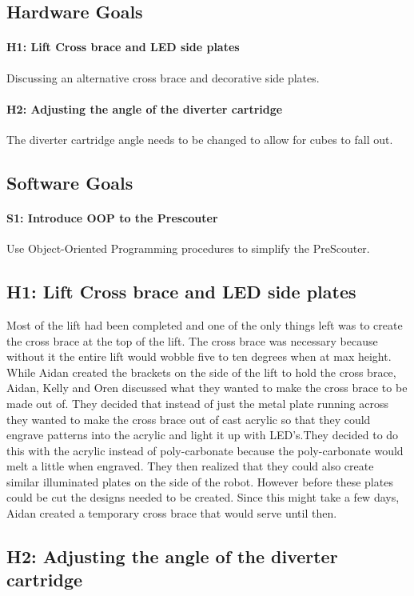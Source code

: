 \documentclass{article}
\begin{document}
\subsection{Hardware Goals}
\paragraph{H1: Lift Cross brace and LED side plates}
 Discussing an alternative cross brace and decorative side plates.
\paragraph{H2: Adjusting the angle of the diverter cartridge}
 The diverter cartridge angle needs to be changed to allow for cubes to fall out.
\subsection{Software Goals}
\paragraph{S1: Introduce OOP to the Prescouter}
 Use Object-Oriented Programming procedures to simplify the PreScouter.
\newpage
\subsection{H1: Lift Cross brace and LED side plates}

Most of the lift had been completed and one of the only things left was to create the cross brace at the top of the lift. The cross brace was necessary because without it the entire lift would wobble five to ten degrees when at max height. While Aidan created the brackets on the side of the lift to hold the cross brace, Aidan, Kelly and Oren discussed what they wanted to make the cross brace to be made out of. They decided that instead of just the metal plate running across they wanted to make the cross brace out of cast acrylic so that they could engrave patterns into the acrylic and light it up with LED's.They decided to do this with the acrylic instead of poly-carbonate because the poly-carbonate would melt a little when engraved. They then realized that they could also create similar illuminated plates on the side of the robot. However before these plates could be cut the designs needed to be created. Since this might take a few days, Aidan created a temporary cross brace that would serve until then.

\subsection{H2: Adjusting the angle of the diverter cartridge}
\end{document}
